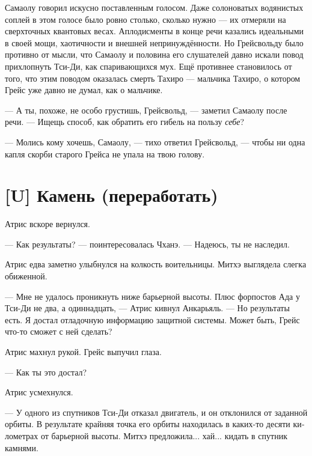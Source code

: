 \documentclass[a4paper,12pt,fleqn]{book}\usepackage{polyglossia}\setdefaultlanguage[babelshorthands=true]{russian}\setotherlanguage{english}\defaultfontfeatures{Ligatures=TeX,Mapping=tex-text}\usepackage{xcolor}\newcommand{\ml}[3]{#2}
\begin{document}
Самаолу говорил искусно поставленным голосом.
Даже солоноватых водянистых соплей в этом голосе было ровно столько, сколько нужно --- их отмеряли на сверхточных квантовых весах.
Аплодисменты в конце речи казались идеальными в своей мощи, хаотичности и внешней непринуждённости.
\ml{$0$}
{Но Грейсвольду было противно от мысли, что Самаолу и половина его слушателей давно искали повод прихлопнуть Тси-Ди, как спаривающихся мух.}
{But Grejsvolt hated even the thought that Samajolu and a half of his audience were always looking for an excuse to swat Qi-Di like mating flies.}
\ml{$0$}
{Ещё противнее становилось от того, что этим поводом оказалась смерть Тахиро --- мальчика Тахиро, о котором Грейс уже давно не думал, как о мальчике.}
{The only thing he hated more was another thought: the same excuse was death of Tahiro-kid; Grejsvolt didn't thought of Tajiro as a kid for ages.}

--- А ты, похоже, не особо грустишь, Грейсвольд, --- заметил Самаолу после речи.
--- Ищещь способ, как обратить его гибель на пользу \emph{себе}?

\ml{$0$}
{--- Молись кому хочешь, Самаолу, --- тихо ответил Грейсвольд, --- чтобы ни одна капля скорби старого Грейса не упала на твою голову.}
{``Pray to whatever you want, Samajolu,'' Grejsvolt answered quietly, ``that no one drop of Old Grejs' sorrow falls on your head.''}

\section{[U] Камень (переработать)}

Атрис вскоре вернулся.

--- Как результаты? --- поинтересовалась Чханэ.
--- Надеюсь, ты не наследил.

Атрис едва заметно улыбнулся на колкость воительницы.
Митхэ выглядела слегка обиженной.

--- Мне не удалось проникнуть ниже барьерной высоты.
Плюс форпостов Ада у Тси-Ди не два, а одиннадцать, --- Атрис кивнул Анкарьяль.
--- Но результаты есть.
Я достал отладочную информацию защитной системы.
Может быть, Грейс что-то сможет с ней сделать?

Атрис махнул рукой.
Грейс выпучил глаза.

--- Как ты это достал?

Атрис усмехнулся.

--- У одного из спутников Тси-Ди отказал двигатель, и он отклонился от заданной орбиты.
В результате крайняя точка его орбиты находилась в каких-то десяти километрах от барьерной высоты.
Митхэ предложила... хай... кидать в спутник камнями.
\end{document}
